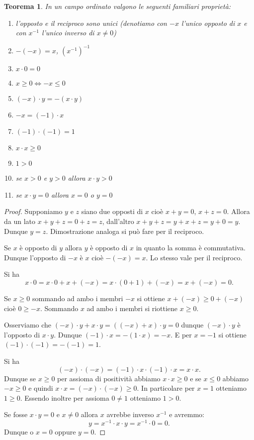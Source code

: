 \documentclass[italian,a4paper,oneside,headinclude]{scrbook}
\newtheorem{theorem}{Teorema}
\begin{document}
\begin{theorem}
In un campo ordinato valgono le seguenti
familiari proprietà:
\begin{enumerate}
  \item l'opposto e il reciproco sono unici (denotiamo con $-x$ l'unico opposto di $x$ e con $x^{-1}$ l'unico inverso di $x\neq 0$)
  \item $-(-x) = x$, $\left(x^{-1}\right)^{-1}$
  \item $x \cdot 0 = 0$
  \item $x\ge 0 \iff -x \le 0$
  \item $(-x)\cdot y = -(x\cdot y)$
  \item $-x = (-1)\cdot x$
  \item $(-1)\cdot(-1) = 1$
  \item $x\cdot x \ge 0$
  \item $1 > 0$
  \item se $x>0$ e  $y>0$  allora $x\cdot y > 0$
  \item se $x\cdot y = 0$ allora $x = 0$ o $y = 0$
\end{enumerate}
\end{theorem}
%
\begin{proof}
Supponiamo $y$ e $z$ siano due opposti di $x$ cioè $x+y=0$, $x+z=0$.
Allora da un lato $x+y+z = 0+z = z$, dall'altro $x+y+z = y+x+z= y+ 0 = y$.
Dunque $y=z$. Dimostrazione analoga si può fare per il reciproco.

Se $x$ è opposto di $y$ allora $y$ è opposto di $x$ in quanto la somma
è commutativa. Dunque l'opposto di $-x$ è $x$ cioè $-(-x)=x$. Lo stesso
vale per il reciproco.

Si ha
\[
x\cdot 0 = x \cdot 0 + x + (-x) %
=x\cdot(0+1) + (-x) = x + (-x) = 0.
\]

Se $x\ge 0$ sommando ad ambo i membri $-x$ si ottiene $x+(-x) \ge 0 + (-x)$
cioè $0 \ge -x$. Sommando $x$ ad ambo i membri si riottiene $x\ge 0$.


Osserviamo che $(-x)\cdot y + x\cdot y = ((-x)+x)\cdot y = 0$ dunque $(-x)\cdot y$ è l'opposto di $x\cdot y$.
Dunque $(-1)\cdot x = - (1 \cdot x) = - x$.
E per $x=-1$ si ottiene $(-1)\cdot(-1) = -(-1) = 1$.

Si ha
\[
(-x)\cdot(-x) = (-1)\cdot x \cdot (-1)\cdot x = x\cdot x.
\]
Dunque se $x\ge 0$ per assioma di positività
abbiamo $x\cdot x\ge 0$ e se $x\le 0$ abbiamo $-x\ge 0$ e quindi
$x\cdot x = (-x)\cdot(-x) \ge 0$.
In particolare per $x=1$ otteniamo $1\ge 0$.
Essendo inoltre per assioma $0\neq 1$ otteniamo $1> 0$.

Se fosse $x\cdot y = 0$ e $x\neq 0$ allora $x$ avrebbe inverso $x^{-1}$
e avremmo:
\[
  y = x^{-1} \cdot x \cdot y = x^{-1}\cdot 0 = 0.
\]
Dunque o $x=0$ oppure $y=0$.

\end{proof}
\end{document}
